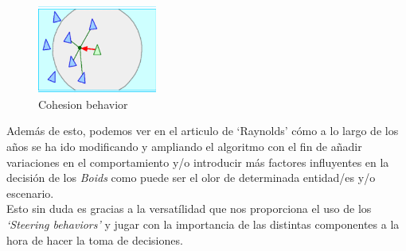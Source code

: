 \begin{figure}[ht]
\centering
\includegraphics[width=0.35\textwidth]{imagenes/marco_teo/cohesion.png}
\caption{Cohesion behavior}
\label{img:cohesion-b}
\end{figure}

Además de esto, podemos ver en el articulo de `Raynolds' cómo a lo largo de los años se
ha ido modificando y ampliando el algoritmo con el fin de añadir variaciones en el
comportamiento y/o introducir más factores influyentes en la decisión de los 
\textit{Boids} como puede ser el olor de determinada entidad/es y/o escenario. \\
Esto sin duda es gracias a la versatílidad que nos proporciona el uso de los
\textit{`Steering behaviors'} y jugar con la importancia de las distintas componentes
a la hora de hacer la toma de decisiones.

